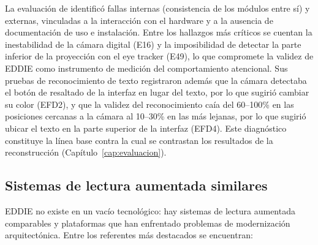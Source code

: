 La evaluación de \citet{ibaceta2023} identificó fallas internas (consistencia de los módulos entre sí) y externas, vinculadas a la interacción con el hardware y a la ausencia de documentación de uso e instalación. Entre los hallazgos más críticos se cuentan la inestabilidad de la cámara digital (E16) y la imposibilidad de detectar la parte inferior de la proyección con el eye tracker (E49), lo que compromete la validez de EDDIE como instrumento de medición del comportamiento atencional. Sus pruebas de reconocimiento de texto registraron además que la cámara detectaba el botón de resaltado de la interfaz en lugar del texto, por lo que sugirió cambiar su color (EFD2), y que la validez del reconocimiento caía del 60--100\% en las posiciones cercanas a la cámara al 10--30\% en las más lejanas, por lo que sugirió ubicar el texto en la parte superior de la interfaz (EFD4). Este diagnóstico constituye la línea base contra la cual se contrastan los resultados de la reconstrucción (Capítulo~\ref{cap:evaluacion}).

\subsection{Sistemas de lectura aumentada similares}

EDDIE no existe en un vacío tecnológico: hay sistemas de lectura aumentada comparables y plataformas que han enfrentado problemas de modernización arquitectónica. Entre los referentes más destacados se encuentran:

